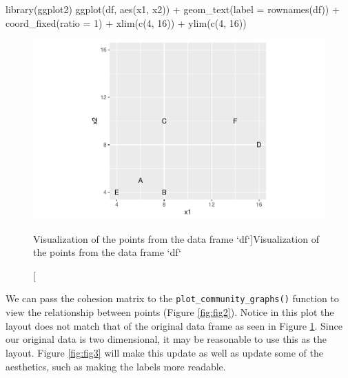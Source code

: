 \begin{Schunk}
\begin{Sinput}
library(ggplot2)
ggplot(df, aes(x1, x2)) +
  geom_text(label = rownames(df)) + 
  coord_fixed(ratio = 1) + 
  xlim(c(4, 16)) + 
  ylim(c(4, 16))
\end{Sinput}
\begin{figure}
\includegraphics{dagostino-mcgowan_files/figure-latex/fig1-1} \caption[Visualization of the points from the data frame `df`]{Visualization of the points from the data frame `df`}\label{fig:fig1}
\end{figure}
\end{Schunk}

We can pass the cohesion matrix to the
\texttt{plot\_community\_graphs()} function to view the relationship
between points (Figure \ref{fig:fig2}). Notice in this plot the layout
does not match that of the original data frame as seen in Figure
\ref{fig:fig1}. Since our original data is two dimensional, it may be
reasonable to use this as the layout. Figure \ref{fig:fig3} will make
this update as well as update some of the aesthetics, such as making the
labels more readable.

